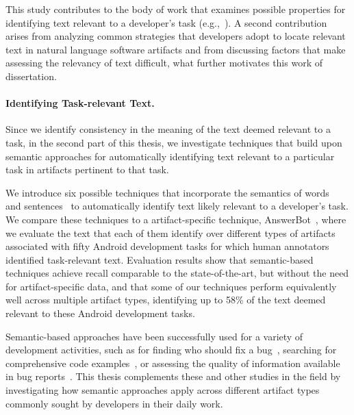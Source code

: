 

This study contributes to the body of work that examines possible properties for identifying text relevant to a developer's task (e.g.,~\cite{Forward2002, Jiang2016b, Robillard2015, Bavota2016}).
A second contribution arises from analyzing
common strategies that developers adopt to locate relevant text
in natural language software artifacts 
and from discussing
factors that make assessing the relevancy of text difficult,
what further motivates this work of dissertation.






\paragraph{\textbf{Identifying Task-relevant Text.}} 


Since we identify consistency in the meaning of the text deemed relevant to a task, 
in the second part of this thesis, we investigate
techniques that build upon semantic approaches 
for automatically identifying text relevant to a particular task in artifacts pertinent to that task.


We introduce six possible techniques that incorporate the semantics of words~\cite{Mikolov2013, Devlin2018Bert}
and sentences~\cite{fillmore1976frame, marques2021}
to automatically identify text likely relevant to a developer's task.
We compare these techniques to a artifact-specific technique, AnswerBot~\cite{Xu2017},
where we evaluate the text that each of them identify
 over different types of artifacts
associated with fifty Android development tasks 
for which human annotators identified task-relevant text.
Evaluation results show that semantic-based techniques
achieve recall comparable to the state-of-the-art, but without the need for artifact-specific data,
and that some of our techniques perform equivalently well across
multiple artifact types, identifying up to 58\%
of the text 
deemed relevant to these Android development tasks.


Semantic-based approaches have been successfully used for a variety of development activities, such as
for finding who should fix a bug~\cite{yang2016}, searching for comprehensive code examples~\cite{silva2019},
or assessing the quality of information available in bug reports~\cite{chaparro2019}.
This thesis complements these and other studies in the field
by investigating how semantic approaches apply across different artifact types
commonly sought by developers in their daily work.




